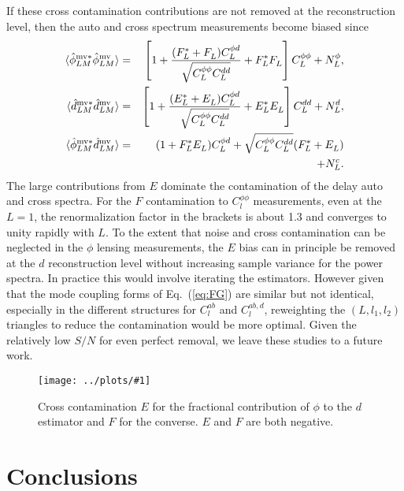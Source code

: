 \documentclass[prd,amsmath,amssymb,floatfix,superscriptaddress,nofootinbib,twocolumn]{revtex4-1}
\def\bea{\begin{eqnarray}}
\def\eea{\end{eqnarray}}
\newcommand{\ec}[1]{Eq.~(\ref{eq:#1})}
\newcommand{\sfig}[2]{
\texttt{[image: ../plots/\#1]}
        }
\newcommand{\Sfig}[2]{
   \begin{figure}[thbp]
   \begin{center}
    \sfig{#1.pdf}{\columnwidth}
    \caption{{\small #2}}
    \label{fig:#1}
     \end{center}
   \end{figure}
}
\begin{document}
 
 

 If these cross contamination contributions are not removed at the reconstruction level, then
 the auto and cross spectrum measurements become biased since
 \bea
  \langle \hat{\phi}^{\rm mv*}_{LM}\hat{\phi}^{\rm mv}_{LM} \rangle &=&
  \left[ 1 +\frac{(F_L^{*}+F_L^{} )C_L^{\phi d}}{\sqrt{C_L^{\phi\phi} C_L^{dd} }}
  + F_L^{*}F_L^{} \right] C_L^{\phi\phi} 
  + N_L^{\phi}, \nonumber\\
    \langle \hat{d}^{\rm mv*}_{LM}\hat{d}^{\rm mv}_{LM} \rangle &=&
  \left[ 1 +\frac{(E_L^{*}+E_L^{} )C_L^{\phi d}}{\sqrt{C_L^{\phi\phi} C_L^{dd} }}
  + E_L^{*}E_L^{} \right] C_L^{dd} 
  + N_L^{d}, \nonumber\\
 \langle \hat{\phi}^{\rm mv*}_{LM}\hat{d}^{\rm mv}_{LM} \rangle&=& (1+ F_L^{*} E_L^{}){C}_{L}^{\phi d}+ \sqrt{C_{L}^{\phi\phi} C_{L}^{dd}} ( F_L^{*} + E_L^{}) \nonumber\\
&&  +N_{L}^{c} .
\eea
The large contributions from $E$ dominate the contamination of the delay auto and cross spectra. For the $F$ contamination to $C_l^{\phi\phi}$ measurements, even at the $L=1$, the renormalization factor in the brackets is about 1.3 and converges to unity rapidly with $L$. To the extent that noise and cross contamination can be neglected in the $\phi$ lensing measurements, the $E$ bias can in principle be removed at the $d$ reconstruction level without increasing sample variance for the power spectra.    In practice this would involve iterating
the estimators.   
However given that the mode 
coupling forms  of \ec{FG} are similar but not identical, especially in the different structures for $C_l^{ab}$ and $C_l^{ab,d}$, reweighting the $(L,l_1,l_2)$ triangles
to reduce the contamination would be more optimal.  Given the relatively low $S/N$ for 
even perfect removal, we leave these studies to a future work.




\Sfig{Cont_multi}{Cross contamination $E$ for the fractional contribution of $\phi$ to the $d$ estimator and $F$ for the converse. $E$ and $F$ are both negative.}


\section{Conclusions}
\end{document}
